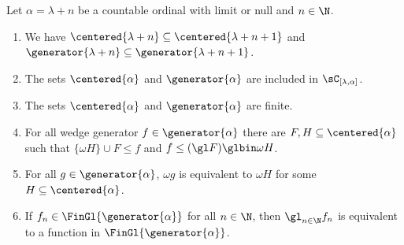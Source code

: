 \begin{proposition}\label{BasicsOnGenerators}
Let $\alpha=\lambda+n$ be a countable ordinal with limit or null and $n\in\N$.
\begin{enumerate}
\item We have $\centered{\lambda+n}\subseteq\centered{\lambda+n+1}$ and $\generator{\lambda+n}\subseteq\generator{\lambda+n+1}$.
\item The sets $\centered{\alpha}$ and $\generator{\alpha}$ are included in $\sC_{[\lambda,\alpha]}$.
\item The sets $\centered{\alpha}$ and $\generator{\alpha}$ are finite. 
\item For all wedge generator $f\in\generator{\alpha}$ there are $F,H\subseteq\centered{\alpha}$ such that $\{\omega H\}\cup F\leq f$ and $f\leq(\gl F)\glbin \omega H$. \label{BasicsOnGenerators_boundingwedge}
\item For all $g\in \generator{\alpha}$, $\omega g$ is equivalent to $\omega H$ for some $H\subseteq \centered{\alpha}$.
\item If $f_n\in\FinGl{\generator{\alpha}}$ for all $n\in\N$, then $\gl_{n\in\N}f_n$ is equivalent to a function in $\FinGl{\generator{\alpha}}$.\label{trickforfinalproof}
\end{enumerate}
\end{proposition}


